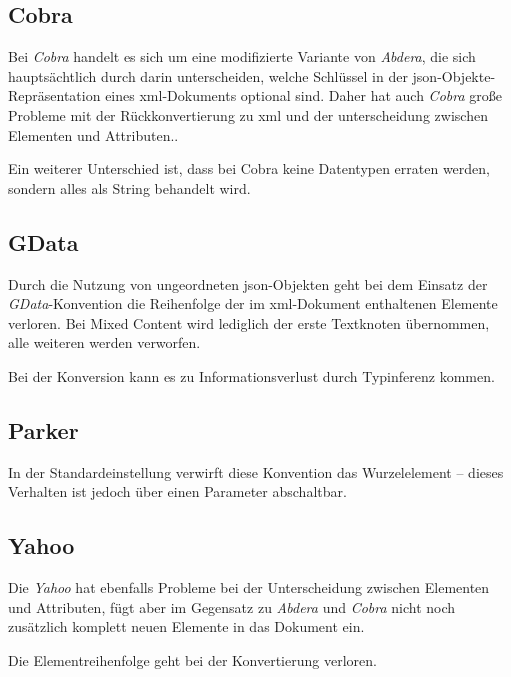 \subsection{Cobra}
\label{sec:xmljson-cobra}

Bei \emph{Cobra} handelt es sich um eine modifizierte Variante von \emph{Abdera}, die sich hauptsächtlich durch darin unterscheiden, welche Schlüssel in der \acrshort{json}-Objekte-Repräsentation eines \acrshort{xml}-Dokuments optional sind. Daher hat auch \emph{Cobra} große Probleme mit der Rückkonvertierung zu \acrshort{xml} und der unterscheidung zwischen Elementen und Attributen..

Ein weiterer Unterschied ist, dass bei Cobra keine Datentypen erraten werden, sondern alles als String behandelt wird.

\subsection{GData}
\label{sec:xmljson-gdata}

Durch die Nutzung von ungeordneten \acrshort{json}-Objekten geht bei dem Einsatz der \emph{GData}-Konvention die Reihenfolge der im \acrshort{xml}-Dokument enthaltenen Elemente verloren. Bei Mixed Content wird lediglich der erste Textknoten übernommen, alle weiteren werden verworfen.

Bei der Konversion kann es zu Informationsverlust durch Typinferenz kommen.

\subsection{Parker}
\label{sec:xmljson-parker}

In der Standardeinstellung verwirft diese Konvention das Wurzelelement -- dieses Verhalten ist jedoch über einen Parameter abschaltbar.


\subsection{Yahoo}
\label{sec:xmljson-yahoo}

Die \emph{Yahoo} hat ebenfalls Probleme bei der Unterscheidung zwischen Elementen und Attributen, fügt aber im Gegensatz zu \emph{Abdera} und \emph{Cobra} nicht noch zusätzlich komplett neuen Elemente in das Dokument ein.

Die Elementreihenfolge geht bei der Konvertierung verloren.

